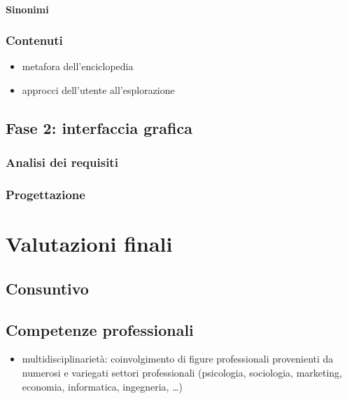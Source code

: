 \documentclass[11pt,a4paper,headsepline,hidelinks]{scrreprt} %
\begin{document}
  \subsubsection{Sinonimi}
  
  \subsection{Contenuti}
  
  \begin{itemize}
    \item metafora dell'enciclopedia
    \item approcci dell'utente all'esplorazione
  \end{itemize}

	\section{Fase 2: interfaccia grafica}
	\label{sec:tesi:stage:fase-2}
	
	\subsection{Analisi dei requisiti}
	
	\subsection{Progettazione}

	\chapter{Valutazioni finali}
	\label{ch:tesi:valutazioni}

	\section{Consuntivo}

	\section{Competenze professionali}
	\begin{itemize}
	\item multidisciplinarietà: coinvolgimento di figure professionali provenienti da numerosi e variegati settori professionali (psicologia, sociologia, marketing, economia, informatica, ingegneria, \ldots)
	\end{itemize}
\end{document}
